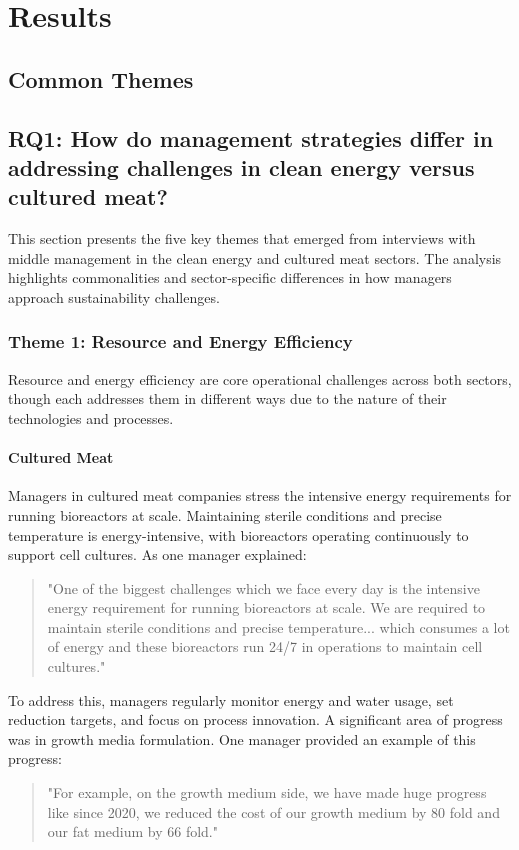 
\section{Results}

\subsection*{Common Themes}

\subsection{RQ1: How do management strategies differ in addressing challenges in clean energy versus cultured meat?}
This section presents the five key themes that emerged from interviews with middle management in the clean energy and cultured meat sectors. The analysis highlights commonalities and sector-specific differences in how managers approach sustainability challenges.

\subsubsection{Theme 1: Resource and Energy Efficiency}
Resource and energy efficiency are core operational challenges across both sectors, though each addresses them in different ways due to the nature of their technologies and processes.

\paragraph{Cultured Meat}
Managers in cultured meat companies stress the intensive energy requirements for running bioreactors at scale. Maintaining sterile conditions and precise temperature is energy-intensive, with bioreactors operating continuously to support cell cultures. As one manager explained:
\begin{quote}
	"One of the biggest challenges which we face every day is the intensive energy requirement for running bioreactors at scale. We are required to maintain sterile conditions and precise temperature... which consumes a lot of energy and these bioreactors run 24/7 in operations to maintain cell cultures."
\end{quote}
To address this, managers regularly monitor energy and water usage, set reduction targets, and focus on process innovation. A significant area of progress was in growth media formulation. One manager provided an example of this progress:
\begin{quote}
	"For example, on the growth medium side, we have made huge progress like since 2020, we reduced the cost of our growth medium by 80 fold and our fat medium by 66 fold."
\end{quote}

